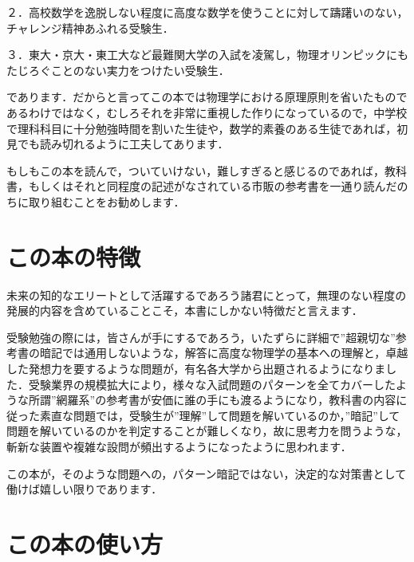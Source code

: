 \documentclass[
  b4paperpaper,
  xelatex,ja=standard]{bxjsbook}
\begin{document}
２．高校数学を逸脱しない程度に高度な数学を使うことに対して躊躇いのない，チャレンジ精神あふれる受験生．

３．東大・京大・東工大など最難関大学の入試を凌駕し，物理オリンピックにもたじろぐことのない実力をつけたい受験生．

であります．だからと言ってこの本では物理学における原理原則を省いたものであるわけではなく，むしろそれを非常に重視した作りになっているので，中学校で理科科目に十分勉強時間を割いた生徒や，数学的素養のある生徒であれば，初見でも読み切れるように工夫してあります．

もしもこの本を読んで，ついていけない，難しすぎると感じるのであれば，教科書，もしくはそれと同程度の記述がなされている市販の参考書を一通り読んだのちに取り組むことをお勧めします．

\hypertarget{ux3053ux306eux672cux306eux7279ux5fb4}{%
\section*{この本の特徴}\label{ux3053ux306eux672cux306eux7279ux5fb4}}


未来の知的なエリートとして活躍するであろう諸君にとって，無理のない程度の発展的内容を含めていることこそ，本書にしかない特徴だと言えます．

受験勉強の際には，皆さんが手にするであろう，いたずらに詳細で''超親切な''参考書の暗記では通用しないような，解答に高度な物理学の基本への理解と，卓越した発想力を要するような問題が，有名各大学から出題されるようになりました．受験業界の規模拡大により，様々な入試問題のパターンを全てカバーしたような所謂''網羅系''の参考書が安価に誰の手にも渡るようになり，教科書の内容に従った素直な問題では，受験生が''理解''して問題を解いているのか，''暗記''して問題を解いているのかを判定することが難しくなり，故に思考力を問うような，斬新な装置や複雑な設問が頻出するようになったように思われます．

この本が，そのような問題への，パターン暗記ではない，決定的な対策書として働けば嬉しい限りであります．

\hypertarget{ux3053ux306eux672cux306eux4f7fux3044ux65b9}{%
\section*{この本の使い方}\label{ux3053ux306eux672cux306eux4f7fux3044ux65b9}}

\end{document}
